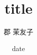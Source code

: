 \documentclass[dvipdfmx,12pt]{beamer}%
\title{title}
\author{郡 茉友子}
\date{date}
\begin{document}
\maketitle

\begin{frame}{}
\end{frame}
\end{document}
